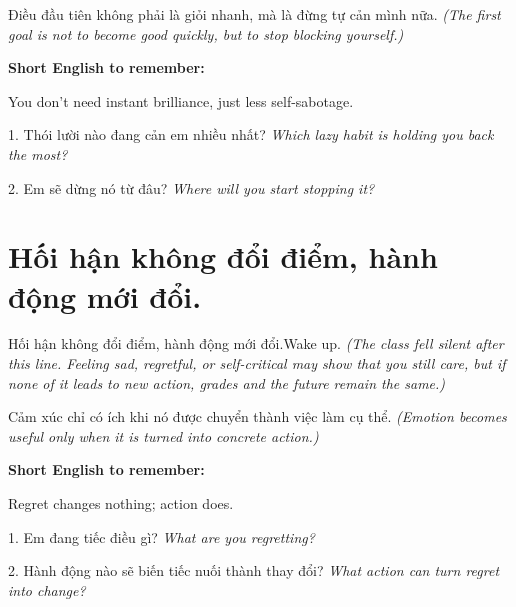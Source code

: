 \begin{baihoc}
Điều đầu tiên không phải là giỏi nhanh, mà là đừng tự cản mình nữa.
\textit{(The first goal is not to become good quickly, but to stop blocking yourself.)}
\end{baihoc}

\begin{ghinhoanh}
\textbf{Short English to remember:}

You don't need instant brilliance, just less self-sabotage.

\end{ghinhoanh}

\begin{tuhocnhanh}
1. Thói lười nào đang cản em nhiều nhất? \textit{Which lazy habit is holding you back the most?}

2. Em sẽ dừng nó từ đâu? \textit{Where will you start stopping it?}
\end{tuhocnhanh}
\ngancach

\section{Hối hận không đổi điểm, hành động mới đổi.}
\begin{truyen}{Hối hận không đổi điểm, hành động mới đổi.}{Wake up.}
\textit{(The class fell silent after this line. Feeling sad, regretful, or self-critical may show that you still care, but if none of it leads to new action, grades and the future remain the same.)}
\end{truyen}

\begin{baihoc}
Cảm xúc chỉ có ích khi nó được chuyển thành việc làm cụ thể.
\textit{(Emotion becomes useful only when it is turned into concrete action.)}
\end{baihoc}

\begin{ghinhoanh}
\textbf{Short English to remember:}

Regret changes nothing; action does.

\end{ghinhoanh}

\begin{tuhocnhanh}
1. Em đang tiếc điều gì? \textit{What are you regretting?}

2. Hành động nào sẽ biến tiếc nuối thành thay đổi? \textit{What action can turn regret into change?}
\end{tuhocnhanh}
\ngancach

